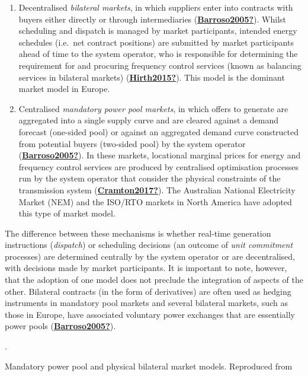 \documentclass[12pt,a4paper,]{report}
\begin{document}
\begin{enumerate}
\def\labelenumi{\arabic{enumi}.}
\item
  Decentralised \emph{bilateral markets}, in which suppliers enter into
  contracts with buyers either directly or through intermediaries
  (\protect\hyperlink{ref-Barroso2005}{\textbf{Barroso2005?}}). Whilst
  scheduling and dispatch is managed by market participants, intended
  energy schedules (i.e.~net contract positions) are submitted by market
  participants ahead of time to the system operator, who is responsible
  for determining the requirement for and procuring frequency control
  services (known as balancing services in bilateral markets)
  (\protect\hyperlink{ref-Hirth2015}{\textbf{Hirth2015?}}). This model
  is the dominant market model in Europe.
\item
  Centralised \emph{mandatory power pool markets}, in which offers to
  generate are aggregated into a single supply curve and are cleared
  against a demand forecast (one-sided pool) or against an aggregated
  demand curve constructed from potential buyers (two-sided pool) by the
  system operator
  (\protect\hyperlink{ref-Barroso2005}{\textbf{Barroso2005?}}). In these
  markets, locational marginal prices for energy and frequency control
  services are produced by centralised optimisation processes run by the
  system operator that consider the physical constraints of the
  transmission system
  (\protect\hyperlink{ref-Cramton2017}{\textbf{Cramton2017?}}). The
  Australian National Electricity Market (NEM) and the ISO/RTO markets
  in North America have adopted this type of market model.
\end{enumerate}

The difference between these mechanisms is whether real-time generation
instructions (\emph{dispatch}) or scheduling decisions (an outcome of
\emph{unit commitment} processes) are determined centrally by the system
operator or are decentralised, with decisions made by market
participants. It is important to note, however, that the adoption of one
model does not preclude the integration of aspects of the other.
Bilateral contracts (in the form of derivatives) are often used as
hedging instruments in mandatory pool markets and several bilateral
markets, such as those in Europe, have associated voluntary power
exchanges that are essentially power pools
(\protect\hyperlink{ref-Barroso2005}{\textbf{Barroso2005?}}).

. \protect\hypertarget{fig:market_models}{}{}

Mandatory power pool and physical bilateral market models. Reproduced
from {}
\end{document}
